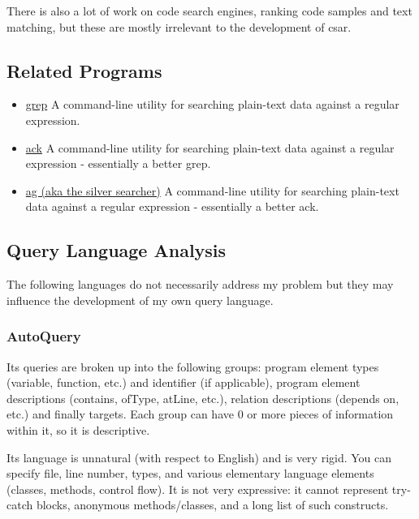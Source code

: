 \documentclass[12pt, letterpaper]{article}
\begin{document}
There is also a lot of work on code search engines, ranking code samples and text matching, but these are mostly irrelevant to the development of csar.

\subsection{Related Programs}
\begin{itemize}
    \item \href{https://en.wikipedia.org/wiki/Grep}{grep}\newline
    A command-line utility for searching plain-text data against a regular expression.
    \item \href{https://beyondgrep.com/}{ack}\newline
    A command-line utility for searching plain-text data against a regular expression - essentially a better grep.
    \item \href{https://github.com/ggreer/the_silver_searcher}{ag (aka the silver searcher)}\newline
    A command-line utility for searching plain-text data against a regular expression - essentially a better ack.
\end{itemize}

\subsection{Query Language Analysis}
The following languages do not necessarily address my problem but they may influence the development of my own query language.

\subsubsection{AutoQuery}
Its queries are broken up into the following groups: program element types (variable, function, etc.) and identifier (if applicable), program element descriptions (contains, ofType, atLine, etc.), relation descriptions (depends on, etc.) and finally targets.
Each group can have 0 or more pieces of information within it, so it is descriptive.

Its language is unnatural (with respect to English) and is very rigid.
You can specify file, line number, types, and various elementary language elements (classes, methods, control flow).
It is not very expressive: it cannot represent try-catch blocks, anonymous methods/classes, and a long list of such constructs.
\end{document}
